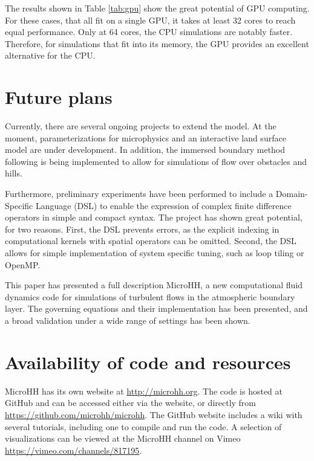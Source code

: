 \documentclass[gmd]{copernicus}
\begin{document}
The results shown in Table \ref{tab:gpu} show the great potential of GPU computing. For these cases, that all fit on a single GPU, it takes at least 32 cores to reach equal performance. Only at 64 cores, the CPU simulations are notably faster. Therefore, for simulations that fit into its memory, the GPU provides an excellent alternative for the CPU.

\section{Future plans}\label{sec:future}
Currently, there are several ongoing projects to extend the model. At the moment, parameterizations for microphysics and an interactive land surface model are under development. In addition, the immersed boundary method following \citet{Tseng2003} is being implemented to allow for simulations of flow over obstacles and hills.

Furthermore, preliminary experiments have been performed to include a Domain-Specific Language (DSL) to enable the expression of complex finite difference operators in simple and compact syntax. The project has shown great potential, for two reasons. First, the DSL prevents errors, as the explicit indexing in computational kernels with spatial operators can be omitted. Second, the DSL allows for simple implementation of system specific tuning, such as loop tiling or OpenMP.



\conclusions  \label{sec:conclusion} %
This paper has presented a full description MicroHH, a new computational fluid dynamics code for simulations of turbulent flows in the atmospheric boundary layer. The governing equations and their implementation has been presented, and a broad validation under a wide range of settings has been shown.

\section{Availability of code and resources}\label{sec:howto}
MicroHH has its own website at \url{http://microhh.org}. The code is hosted at GitHub and can be accessed either via the website, or directly from 
\url{https://github.com/microhh/microhh}. The GitHub website includes a wiki with several tutorials, including one to compile and run the code. A selection of visualizations can be viewed at the MicroHH channel on Vimeo \url{https://vimeo.com/channels/817195}.
\end{document}
